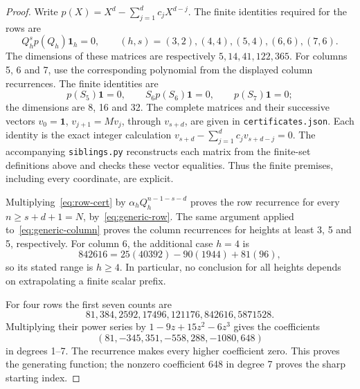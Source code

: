 \documentclass[11pt,a4paper]{article}
\newcommand{\ones}{\boldsymbol{1}}
\begin{document}
\begin{proof}
Write \(p(X)=X^d-\sum_{j=1}^dc_jX^{d-j}\).
The finite identities required for the rows are
\begin{equation}\label{eq:row-cert}
 Q_h^s p(Q_h)\ones_h=0,
 \qquad (h,s)=(3,2),(4,4),(5,4),(6,6),(7,6).
\end{equation}
The dimensions of these matrices are respectively \(5,14,41,122,365\).
For columns 5, 6 and 7, use the corresponding polynomial from the
displayed column recurrences. The finite identities are
\begin{equation}\label{eq:column-cert}
 p(S_5)\boldsymbol{1}=0,\qquad
 S_6p(S_6)\boldsymbol{1}=0,\qquad
 p(S_7)\boldsymbol{1}=0;
\end{equation}
the dimensions are 8, 16 and 32. The complete matrices and their
successive vectors \(v_0=\boldsymbol{1}\), \(v_{j+1}=Mv_j\), through
\(v_{s+d}\), are given in \texttt{certificates.json}.
Each identity is the exact integer calculation
\(v_{s+d}-\sum_{j=1}^d c_jv_{s+d-j}=0\).
The accompanying \texttt{siblings.py} reconstructs each matrix from
the finite-set definitions above and checks these vector equalities.
Thus the finite premises, including every coordinate, are explicit.

Multiplying~\eqref{eq:row-cert} by
\(\alpha_h Q_h^{n-1-s-d}\) proves the row recurrence for every
\(n\ge s+d+1=N\), by~\eqref{eq:generic-row}.
The same argument applied to~\eqref{eq:generic-column} proves the
column recurrences for heights at least 3, 5 and 5, respectively.
For column 6, the additional case \(h=4\) is
\[
 842616=25(40392)-90(1944)+81(96),
\]
so its stated range is \(h\ge4\). In particular, no conclusion
for all heights depends on extrapolating a finite scalar prefix.

For four rows the first seven counts are
\[
81,384,2592,17496,121176,842616,5871528.
\]
Multiplying their power series by \(1-9z+15z^2-6z^3\) gives the coefficients
\[
 (81,-345,351,-558,288,-1080,648)
\]
in degrees 1--7.
The recurrence makes every higher coefficient zero. This proves the
generating function; the nonzero coefficient 648 in degree 7 proves
the sharp starting index.
\end{proof}
\end{document}
